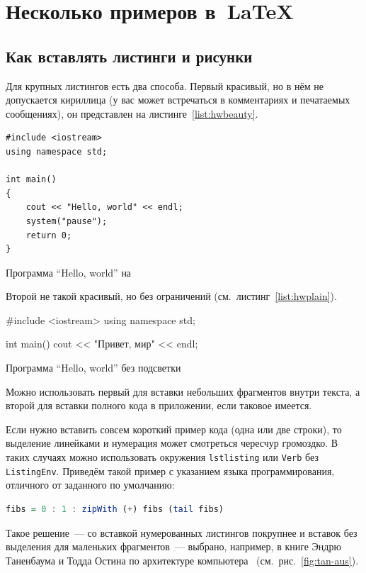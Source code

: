\section{Несколько примеров в~\LaTeX{}}
\label{sec:examples}
\subsection{Как вставлять листинги и рисунки}
Для крупных листингов есть два способа. Первый красивый, но в нём не допускается
кириллица (у вас может встречаться в комментариях и
печатаемых сообщениях), он представлен на листинге~\ref{list:hwbeauty}.
\begin{ListingEnv}[H]%
\begin{lstlisting}
#include <iostream>
using namespace std;

int main()
{
    cout << "Hello, world" << endl;
    system("pause");
    return 0;
}
\end{lstlisting}
\caption{Программа “Hello, world” на \protect\cpp}\label{list:hwbeauty}
\end{ListingEnv}

Второй не такой красивый, но без ограничений (см.~листинг~\ref{list:hwplain}).
\begin{ListingEnv}[H]
\begin{Verb}

#include <iostream>
using namespace std;

int main()
{
    cout << "Привет, мир" << endl;
}
\end{Verb}
\caption{Программа “Hello, world” без подсветки}
\label{list:hwplain}
\end{ListingEnv}

Можно использовать первый для вставки небольших фрагментов
внутри текста, а второй для вставки полного
кода в приложении, если таковое имеется.

Если нужно вставить совсем короткий пример кода (одна или две строки), то выделение  линейками и нумерация может смотреться чересчур громоздко. В таких случаях можно использовать окружения \texttt{lstlisting} или \texttt{Verb} без \texttt{ListingEnv}. Приведём такой пример с указанием языка программирования, отличного от заданного по умолчанию:
\begin{lstlisting}[language=Haskell]
fibs = 0 : 1 : zipWith (+) fibs (tail fibs)
\end{lstlisting}
Такое решение~--- со вставкой нумерованных листингов покрупнее
и вставок без выделения для маленьких фрагментов~--- выбрано,
например, в книге Эндрю Таненбаума и Тодда Остина по архитектуре
компьютера~\autocite{TanAus2013} (см.~рис.~\ref{fig:tan-aus}).

